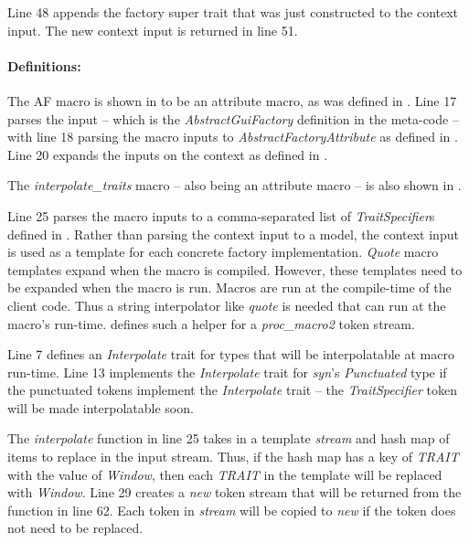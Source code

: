 Line 48 appends the factory super trait that was just constructed to the context input.
The new context input is returned in line 51.

\paragraph{Definitions:}
The AF macro is shown in  to be an attribute macro, as was defined in .
Line 17 parses the input  -- which is the \textit{AbstractGuiFactory} definition in the meta-code -- with line 18 parsing the macro inputs to \textit{AbstractFactoryAttribute} as defined in .
Line 20 expands the inputs on the context as defined in .

The \textit{interpolate\_traits} macro -- also being an attribute macro -- is also shown in .

Line 25 parses the macro inputs to a comma-separated list of \textit{TraitSpecifier}s defined in .
Rather than parsing the context input to a model, the context input is used as a template for each concrete factory implementation.
\textit{Quote} macro templates expand when the macro is compiled.
However, these templates need to be expanded when the macro is run.
Macros are run at the compile-time of the client code.
Thus a string interpolator like \textit{quote} is needed that can run at the macro's run-time.
 defines such a helper for a \textit{proc\_macro2} token stream.

Line 7 defines an \textit{Interpolate} trait for types that will be interpolatable at macro run-time.
Line 13 implements the \textit{Interpolate} trait for \textit{syn}'s \textit{Punctuated} type if the punctuated tokens implement the \textit{Interpolate} trait -- the \textit{TraitSpecifier} token will be made interpolatable soon.

The \textit{interpolate} function in line 25 takes in a template \textit{stream} and hash map of items to replace in the input stream.
Thus, if the hash map has a key of \textit{TRAIT} with the value of \textit{Window}, then each \textit{TRAIT} in the template will be replaced with \textit{Window}.
Line 29 creates a \textit{new} token stream that will be returned from the function in line 62.
Each token in \textit{stream} will be copied to \textit{new} if the token does not need to be replaced.

